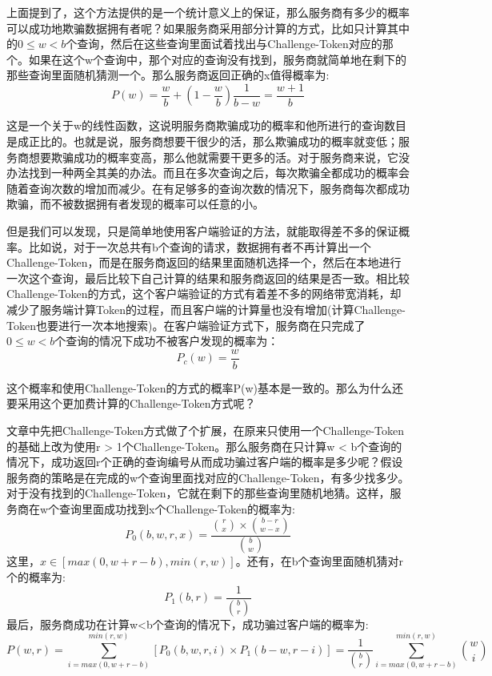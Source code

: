 上面提到了，这个方法提供的是一个统计意义上的保证，那么服务商有多少的概率可以成功地欺骗数据拥有者呢？如果服务商采用部分计算的方式，比如只计算其中的$0 \le w < b$个查询，然后在这些查询里面试着找出与Challenge-Token对应的那个。如果在这个w个查询中，那个对应的查询没有找到，服务商就简单地在剩下的那些查询里面随机猜测一个。那么服务商返回正确的x值得概率为:
\begin{equation} P(w) = \frac{w}{b} + (1 - \frac{w}{b})\frac{1}{b-w} = \frac{w + 1}{b} \end{equation}

这是一个关于w的线性函数，这说明服务商欺骗成功的概率和他所进行的查询数目是成正比的。也就是说，服务商想要干很少的活，那么欺骗成功的概率就变低；服务商想要欺骗成功的概率变高，那么他就需要干更多的活。对于服务商来说，它没办法找到一种两全其美的办法。而且在多次查询之后，每次欺骗全都成功的概率会随着查询次数的增加而减少。在有足够多的查询次数的情况下，服务商每次都成功欺骗，而不被数据拥有者发现的概率可以任意的小。

但是我们可以发现，只是简单地使用客户端验证的方法，就能取得差不多的保证概率。比如说，对于一次总共有b个查询的请求，数据拥有者不再计算出一个Challenge-Token，而是在服务商返回的结果里面随机选择一个，然后在本地进行一次这个查询，最后比较下自己计算的结果和服务商返回的结果是否一致。相比较Challenge-Token的方式，这个客户端验证的方式有着差不多的网络带宽消耗，却减少了服务端计算Token的过程，而且客户端的计算量也没有增加(计算Challenge-Token也要进行一次本地搜索)。在客户端验证方式下，服务商在只完成了$0 \le w < b$个查询的情况下成功不被客户发现的概率为：
\begin{equation} P_c(w) = \frac{w}{b} \end{equation}

这个概率和使用Challenge-Token的方式的概率P(w)基本是一致的。那么为什么还要采用这个更加费计算的Challenge-Token方式呢？

文章中先把Challenge-Token方式做了个扩展，在原来只使用一个Challenge-Token的基础上改为使用r > 1个Challenge-Token。那么服务商在只计算w < b个查询的情况下，成功返回r个正确的查询编号从而成功骗过客户端的概率是多少呢？假设服务商的策略是在完成的w个查询里面找对应的Challenge-Token，有多少找多少。对于没有找到的Challenge-Token，它就在剩下的那些查询里随机地猜。这样，服务商在w个查询里面成功找到x个Challenge-Token的概率为:
\begin{equation} P_0(b, w, r, x) = \frac{\binom{r}{x} \times \binom{b-r}{w-x}}{\binom{b}{w}} \end{equation}
这里，$x \in [max(0, w+r-b), min(r,w)]$。还有，在b个查询里面随机猜对r个的概率为:
\begin{equation} P_1(b,r) = \frac{1}{\binom{b}{r}} \end{equation}
最后，服务商成功在计算w<b个查询的情况下，成功骗过客户端的概率为:
\begin{equation} P(w,r) = \sum_{i=max(0,w+r-b)}^{min(r,w)} [P_0(b,w,r,i) \times P_1(b-w,r-i)] = \frac{1}{\binom{b}{r}}\sum_{i=max(0,w+r-b)}^{min(r,w)}\binom{w}{i} \end{equation}

